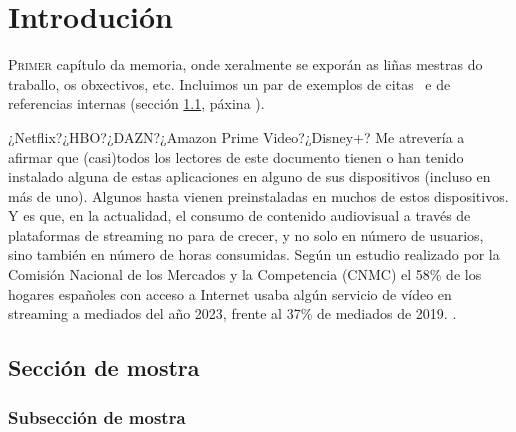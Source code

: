 \chapter{Introdución}
\label{chap:introducion}

\lettrine{P}{rimer} capítulo da memoria, onde xeralmente se exporán as
liñas mestras do traballo, os obxectivos, etc. Incluimos un par de
exemplos de citas~\cite{ErlangBook,ErlangWebBook} e de referencias
internas (sección \ref{sec:mostra}, páxina \pageref{sec:mostra}).

¿Netflix?¿HBO?¿DAZN?¿Amazon Prime Video?¿Disney+? Me atrevería a afirmar que
(casi)todos los lectores de este documento tienen o han tenido instalado alguna de 
estas aplicaciones en alguno de sus dispositivos (incluso en más de uno). Algunos 
hasta vienen preinstaladas en muchos de estos dispositivos. Y es que, en la actualidad,
el consumo de contenido audiovisual a través de plataformas de streaming no para de crecer, 
y no solo en número de usuarios, sino también en número de horas consumidas. Según un estudio
realizado por la Comisión Nacional de los Mercados y la Competencia (CNMC) el 58\% de los hogares 
españoles con acceso a Internet usaba algún servicio de vídeo en streaming a mediados del año 2023, 
frente al 37\% de mediados de 2019. \cite{CNMC}. 

\Blindtext

\section{Sección de mostra}
\label{sec:mostra}

\Blindtext

\subsection{Subsección de mostra}

\Blindtext
